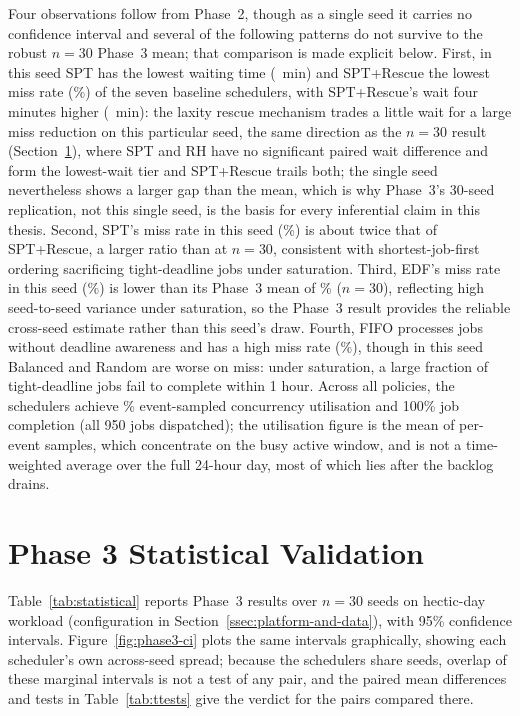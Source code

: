 {Four observations follow from Phase~2, though as a single seed it carries no confidence interval and several of the following patterns do not survive to the robust $n=30$ Phase~3 mean; that comparison is made explicit below. First, in this seed SPT has the lowest waiting time (\PhTwoSPTwait~min) and SPT+Rescue the lowest miss rate (\PhTwoRescueMiss\%) of the seven baseline schedulers, with SPT+Rescue's wait four minutes higher (\PhTwoRescueWait~min): the laxity rescue mechanism trades a little wait for a large miss reduction on this particular seed, the same direction as the $n=30$ result (Section~\ref{sec:phase-3-statistical-validation}), where SPT and RH have no significant paired wait difference and form the lowest-wait tier and SPT+Rescue trails both; the single seed nevertheless shows a larger gap than the mean, which is why Phase~3's 30-seed replication, not this single seed, is the basis for every inferential claim in this thesis. Second, SPT's miss rate in this seed (\PhTwoSPTmiss\%) is about twice that of SPT+Rescue, a larger ratio than at $n=30$, consistent with shortest-job-first ordering sacrificing tight-deadline jobs under saturation. Third, EDF's miss rate in this seed (\PhTwoEDFmiss\%) is lower than its Phase~3 mean of \EDFmiss\% ($n=30$), reflecting high seed-to-seed variance under saturation, so the Phase~3 result provides the reliable cross-seed estimate rather than this seed's draw. Fourth, FIFO processes jobs without deadline awareness and has a high miss rate (\PhTwoFIFOmiss\%), though in this seed Balanced and Random are worse on miss: under saturation, a large fraction of tight-deadline jobs fail to complete within 1 hour. Across all policies, the schedulers achieve \PhTwoUtilPct\% event-sampled concurrency utilisation and 100\% job completion (all 950 jobs dispatched); the utilisation figure is the mean of per-event samples, which concentrate on the busy active window, and is not a time-weighted average over the full 24-hour day, most of which lies after the backlog drains.

\section{Phase 3 Statistical Validation}
\label{sec:phase-3-statistical-validation}

Table~\ref{tab:statistical} reports Phase~3 results over $n=30$ seeds on hectic-day workload (configuration in Section~\ref{ssec:platform-and-data}), with 95\% confidence intervals. Figure~\ref{fig:phase3-ci} plots the same intervals graphically, showing each scheduler's own across-seed spread; because the schedulers share seeds, overlap of these marginal intervals is not a test of any pair, and the paired mean differences and tests in Table~\ref{tab:ttests} give the verdict for the pairs compared there.

}
